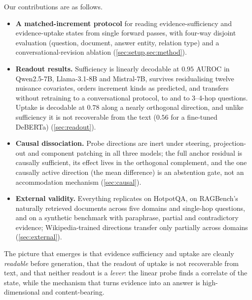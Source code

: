 Our contributions are as follows.
\begin{itemize}
  \item \textbf{A matched-increment protocol} for reading evidence-sufficiency and evidence-uptake states from single forward passes, with four-way disjoint evaluation (question, document, answer entity, relation type) and a conversational-revision ablation (\cref{sec:setup,sec:method}).
  \item \textbf{Readout results.} Sufficiency is linearly decodable at $0.95$ AUROC in Qwen2.5-7B, Llama-3.1-8B and Mistral-7B, survives residualising twelve nuisance covariates, orders increment kinds as predicted, and transfers without retraining to a conversational protocol, to \twowiki{} and to 3--4-hop questions. Uptake is decodable at $0.78$ along a nearly orthogonal direction, and unlike sufficiency it is not recoverable from the text ($0.56$ for a fine-tuned DeBERTa) (\cref{sec:readout}).
  \item \textbf{Causal dissociation.} Probe directions are inert under steering, projection-out and component patching in all three models; the full anchor residual is causally sufficient, its effect lives in the orthogonal complement, and the one causally active direction (the mean difference) is an abstention gate, not an accommodation mechanism (\cref{sec:causal}).
  \item \textbf{External validity.} Everything replicates on HotpotQA, on RAGBench's naturally retrieved documents across five domains and single-hop questions, and on a synthetic benchmark with paraphrase, partial and contradictory evidence; Wikipedia-trained directions transfer only partially across domains (\cref{sec:external}).
\end{itemize}
The picture that emerges is that evidence sufficiency and uptake are cleanly \emph{readable} before generation, that the readout of uptake is not recoverable from text, and that neither readout is a \emph{lever}: the linear probe finds a correlate of the state, while the mechanism that turns evidence into an answer is high-dimensional and content-bearing.
